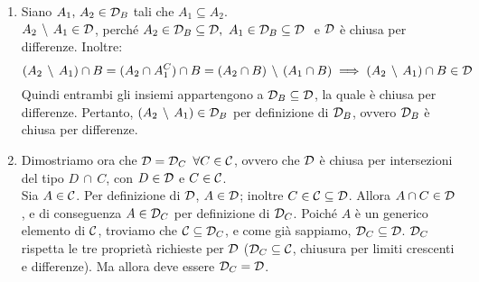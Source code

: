 \begin{dimo}
\begin{enumerate}
  \item Siano $A_1, \, A_2 \in \mathcal D_B$ tali che $A_1 \subseteq A_2$. \\
  $A_2 \, \setminus \, A_1 \in \mathcal D$, perché $A_2 \in \mathcal D_B \subseteq \mathcal D, \ A_1 \in \mathcal D_B \subseteq \mathcal D \ $ e $\mathcal D$ è chiusa per differenze.
  Inoltre:
  $$(A_2 \, \setminus \, A_1) \cap B = (A_2 \cap A_1^C) \cap B = (A_2 \cap B) \, \setminus \, (A_1 \cap B) \implies (A_2 \, \setminus \, A_1) \cap B \in \mathcal D$$
  Quindi entrambi gli insiemi appartengono a $\mathcal D_B \subseteq \mathcal D$, la quale è chiusa per differenze.
  Pertanto, $(A_2 \, \setminus \, A_1) \in \mathcal D_B$ per definizione di $\mathcal D_B$, ovvero $\mathcal D_B$ è chiusa per differenze.
  \item Dimostriamo ora che $\mathcal D = \mathcal D_C \enspace \forall C \in \mathcal C$, ovvero che $\mathcal D$ è chiusa per intersezioni del tipo $D \, \cap \, C$, con $D \in \mathcal D$ e $C \in \mathcal C$. \\
  Sia $A \in \mathcal C$. Per definizione di $\mathcal D$, $A \in \mathcal D$; inoltre $C \in \mathcal C \subseteq \mathcal D$. Allora $A \cap C \in \mathcal D$, e di conseguenza $A \in \mathcal D_C$ per definizione di $\mathcal D_C$.
  Poiché $A$ è un generico elemento di $\mathcal C$, troviamo che $\mathcal C \subseteq \mathcal D_C$, e come già sappiamo, $\mathcal D_C \subseteq \mathcal D$. $\mathcal D_C$ rispetta le tre proprietà richieste per $\mathcal D$ ($\mathcal D_C \subseteq \mathcal C$, chiusura per limiti crescenti e differenze). Ma allora deve essere $\mathcal D_C = \mathcal D$.


\end{enumerate}
\end{dimo}
